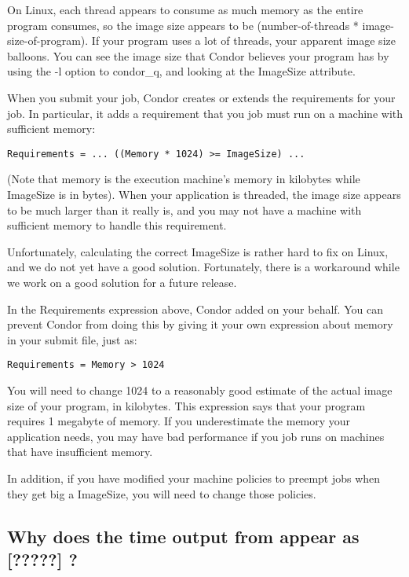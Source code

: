 On Linux, each thread appears to consume as much memory as the entire
program consumes, so the image size appears to be (number-of-threads *
image-size-of-program). If your program uses a lot of threads, your
apparent image size balloons. You can see the image size that Condor
believes your program has by using the -l option to condor\_q, and
looking at the ImageSize attribute.

When you submit your job, Condor creates or extends the requirements
for your job. In particular, it adds a requirement that you job must
run on a machine with sufficient memory:

\footnotesize
\begin{verbatim}
Requirements = ... ((Memory * 1024) >= ImageSize) ...
\end{verbatim}
\normalsize

(Note that memory is the execution machine's memory in kilobytes while
ImageSize is in bytes). When your application is threaded, the
image size appears to be much larger than it really is, and you may not
have a machine with sufficient memory to handle this requirement.

Unfortunately, calculating the correct ImageSize is rather hard to fix
on Linux, and we do not yet have a good solution. Fortunately, there
is a workaround while we work on a good solution for a future
release.

In the Requirements expression above, Condor added  on your behalf. You can prevent Condor from doing this by
giving it your own expression about memory in your submit file, just
as:

\begin{verbatim}
Requirements = Memory > 1024
\end{verbatim}

You will need to change 1024 to a reasonably good estimate of the actual
image size of your program, in kilobytes. This expression says that
your program requires 1 megabyte of memory. If you underestimate the
memory your application needs, you may have bad performance if you job
runs on machines that have insufficient memory.

In addition, if you have modified your machine policies to preempt
jobs when they get big a ImageSize, you will need to change those
policies.

\subsection*{Why does the time output from  appear
as [?????] ? }

